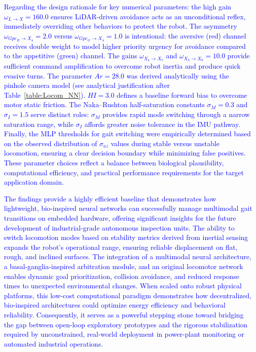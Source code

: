 \documentclass[preprint,12pt]{elsarticle}
\newcommand{\revblue}[1]{\textcolor{blue}{#1}}
\begin{document}
\revblue{Regarding the design rationale for key numerical parameters: the high gain $\omega_{L\rightarrow X} = 160.0$ ensures LiDAR-driven avoidance acts as an unconditional reflex, immediately overriding other behaviors to protect the robot. The asymmetry $\omega_{Gpe_R\rightarrow X_4} = 2.0$ versus $\omega_{Gpe_G\rightarrow X_4} = 1.0$ is intentional: the aversive (red) channel receives double weight to model higher priority urgency for avoidance compared to the appetitive (green) channel. The gains $\omega_{X_4\rightarrow X_7}$ and $\omega_{X_3\rightarrow X_8} = 10.0$ provide sufficient command amplification to overcome robot inertia and produce quick evasive turns.} %
\revblue{The parameter $Ar = 28.0$ was derived analytically using the pinhole camera model (see analytical justification after Table~\ref{table:Locom_NN}). $HI = 3.0$ defines a baseline forward bias to overcome motor static friction. The Naka--Rushton half-saturation constants $\sigma_M = 0.3$ and $\sigma_I = 1.5$ serve distinct roles: $\sigma_M$ provides rapid mode switching through a narrow saturation range, while $\sigma_I$ affords greater noise tolerance in the IMU pathway. Finally, the MLP thresholds for gait switching were empirically determined based on the observed distribution of $\sigma_{az}$ values during stable versus unstable locomotion, ensuring a clear decision boundary while minimizing false positives. These parameter choices reflect a balance between biological plausibility, computational efficiency, and practical performance requirements for the target application domain.}


\revblue{The findings provide a highly efficient baseline that demonstrates how lightweight, bio-inspired neural networks can successfully manage multimodal gait transitions on embedded hardware, offering significant insights for the future development of industrial-grade autonomous inspection units. The ability to switch locomotion modes based on stability metrics derived from inertial sensing expands the robot's operational range, ensuring reliable displacement on flat, rough, and inclined surfaces. The integration of a multimodal neural architecture, a basal-ganglia-inspired arbitration module, and an original locomotor network enables dynamic goal prioritization, collision avoidance, and reduced response times to unexpected environmental changes. When scaled onto robust physical platforms, this low-cost computational paradigm demonstrates how decentralized, bio-inspired architectures could optimize energy efficiency and behavioral reliability. Consequently, it serves as a powerful stepping stone toward bridging the gap between open-loop exploratory prototypes and the rigorous stabilization required by unconstrained, real-world deployment in power-plant monitoring or automated industrial operations.} 
\end{document}
